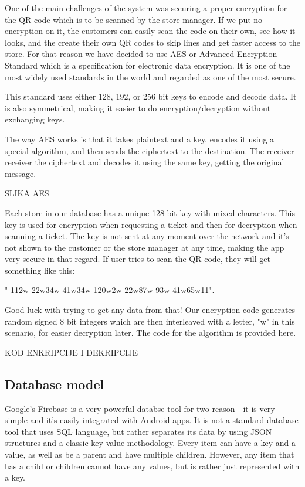 One of the main challenges of the system was securing a proper encryption for the QR code which is to be scanned by the store manager. If we put no encryption on it, the customers can easily scan the code on their own, see how it looks, and the create their own QR codes to skip lines and get faster access to the store. \newline
For that reason we have decided to use AES or Advanced Encryption Standard which is a specification for electronic data encryption. It is one of the most widely used standards in the world and regarded as one of the most secure. \newline

This standard uses either 128, 192, or 256 bit keys to encode and decode data. It is also symmetrical, making it easier to do encryption/decryption without exchanging keys. \newline

The way AES works is that it takes plaintext and a key, encodes it using a special algorithm, and then sends the ciphertext to the destination. The receiver receiver the ciphertext and decodes it using the same key, getting the original message. \newline

SLIKA AES

Each store in our database has a unique 128 bit key with mixed characters. This key is used for encryption when requesting a ticket and then for decryption when scanning a ticket. The key is not sent at any moment over the network and it's not shown to the customer or the store manager at any time, making the app very secure in that regard.\newline
If user tries to scan the QR code, they will get something like this:\newline

"-112w-22w34w-41w34w-120w2w-22w87w-93w-41w65w11".\newline

Good luck with trying to get any data from that!
Our encryption code generates random signed 8 bit integers which are then interleaved with a letter, "w" in this scenario, for easier decryption later. The code for the algorithm is provided here.

KOD ENKRIPCIJE I DEKRIPCIJE

\subsection{Database model}
\hspace{\parindent} Google's Firebase is a very powerful databse tool for two reason - it is very simple and it's easily integrated with Android apps. It is not a standard database tool that uses SQL language, but rather separates its data by using JSON structures and a classic key-value methodology. Every item can have a key and a value, as well as be a parent and have multiple children. However, any item that has a child or children cannot have any values, but is rather just represented with a key. \newline

